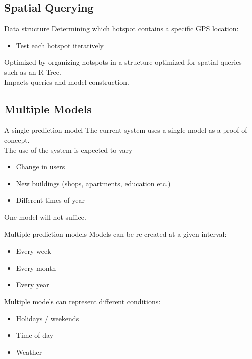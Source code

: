 \subsection{Spatial Querying}
\begin{frame}{Data structure}{}
Determining which hotspot contains a specific GPS location:
\begin{itemize}
\item Test each hotspot iteratively
\end{itemize}
\vspace{1em}
Optimized by organizing hotspots in a structure optimized for spatial queries such as an R-Tree.\\
\vspace{1em}
Impacts queries and model construction.
\end{frame}

\subsection{Multiple Models}
\begin{frame}{A single prediction model}
The current system uses a single model as a proof of concept.\\
\vspace{1em}
The use of the system is expected to vary
\begin{itemize}
\item Change in users
\item New buildings (shops, apartments, education etc.)
\item Different times of year
\end{itemize}
\vspace{1em}
One model will not suffice.
\end{frame}

\begin{frame}{Multiple prediction models}
Models can be re-created at a given interval:
\begin{itemize}
\item Every week
\item Every month
\item Every year
\end{itemize}
\vspace{1em}
Multiple models can represent different conditions:
\begin{itemize}
\item Holidays / weekends
\item Time of day
\item Weather
\end{itemize}
\end{frame}